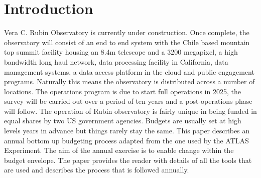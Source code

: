 \section{Introduction} \label{sec:intro}
Vera C. Rubin Observatory\cite{2008arXiv0805.2366I} is currently under construction. Once complete, the observatory will consist of an end to end system  with the Chile based mountain top summit facility housing an 8.4m telescope and a 3200 megapixel, a high bandwidth long haul network, data processing facility in California, data management systems, a data access platform in the cloud and public engagement programs. Naturally this means the observatory is distributed across a number of locations. The operations program is due to start full operations in 2025, the survey will be carried out over a period of ten years and a post-operations phase will follow. The operation of Rubin observatory is fairly unique in being funded in equal shares by two US government agencies. Budgets are usually set at high levels years in advance but things rarely stay the same. This paper describes an annual bottom up budgeting process adapted from the one used by the ATLAS Experiment. The aim of the annual exercise is to enable change within the budget envelope.
The paper provides the reader with details of all the tools that are used and describes the process that is followed annually.
